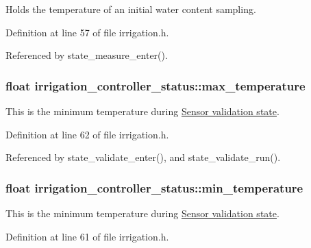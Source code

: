 Holds the temperature of an initial water content sampling. 



Definition at line 57 of file irrigation.\+h.



Referenced by state\+\_\+measure\+\_\+enter().

\hypertarget{structirrigation__controller__status_a1bd8f83a44ee01d3b7cf3851b6716f02}{}
\subsubsection[{max\+\_\+temperature}]{\setlength{\rightskip}{0pt plus 5cm}float irrigation\+\_\+controller\+\_\+status\+::max\+\_\+temperature}\label{structirrigation__controller__status_a1bd8f83a44ee01d3b7cf3851b6716f02}


This is the minimum temperature during \hyperlink{group__state__validate}{Sensor validation state}. 



Definition at line 62 of file irrigation.\+h.



Referenced by state\+\_\+validate\+\_\+enter(), and state\+\_\+validate\+\_\+run().

\hypertarget{structirrigation__controller__status_a451e58983d5995bf6f1e00f9318d5dd6}{}
\subsubsection[{min\+\_\+temperature}]{\setlength{\rightskip}{0pt plus 5cm}float irrigation\+\_\+controller\+\_\+status\+::min\+\_\+temperature}\label{structirrigation__controller__status_a451e58983d5995bf6f1e00f9318d5dd6}


This is the minimum temperature during \hyperlink{group__state__validate}{Sensor validation state}. 



Definition at line 61 of file irrigation.\+h.



